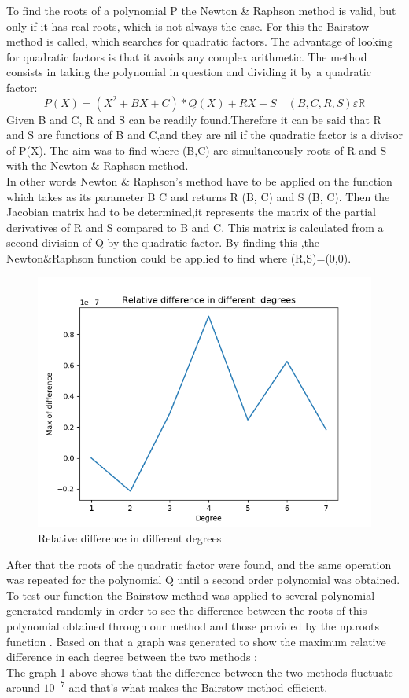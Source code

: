 \documentclass{article}
\begin{document}
To find the roots of a polynomial P the Newton \& Raphson method is valid, but only if it has real roots, which is not always the case. For this the Bairstow method is called, which searches for quadratic factors. The advantage of looking for quadratic factors is that it avoids any complex arithmetic.
The method consists in taking the polynomial in question and dividing it by a quadratic factor: 
\begin{equation}
    P(X)=(X^2 + BX + C)*Q(X)+RX+S \quad (B, C, R , S)   \varepsilon \mathbb{R} 
\end{equation}
Given B and C, R and S can be readily found.Therefore it can be said that R and S are functions of B and C,and they are nil if the quadratic factor is a divisor of P(X).
The aim was to find where (B,C) are simultaneously roots of R and S with the Newton \& Raphson method.\\
In other words Newton \& Raphson's method have to be applied on the function which takes as its parameter B C and returns R (B, C) and S (B, C).
Then the Jacobian matrix had to be determined,it represents the matrix of the partial derivatives of R and S compared to B and C. This matrix is calculated from a second division of Q by the quadratic factor.
By finding this ,the Newton\&Raphson function could be applied to find where (R,S)=(0,0).\\
\begin{figure}[h]
  \centering
  \includegraphics[scale=0.5]{Bairstow.png}
  \caption{Relative difference in different degrees}
  \label{fig:gg}
\end{figure}
After that the roots of the quadratic factor were found, and the same operation was repeated for the polynomial Q until a second order polynomial was obtained.\\
To test our function the Bairstow method was applied to several polynomial generated randomly in order to see the difference between the roots of this polynomial obtained through our method and those provided by the np.roots function .
Based on that a graph was generated to show the maximum relative difference in each degree between the two methods :\\
The graph \ref{fig:gg} above shows that the difference between the two methods fluctuate around $ 10^{-7}$
and that's what makes the Bairstow method efficient.
\end{document}
